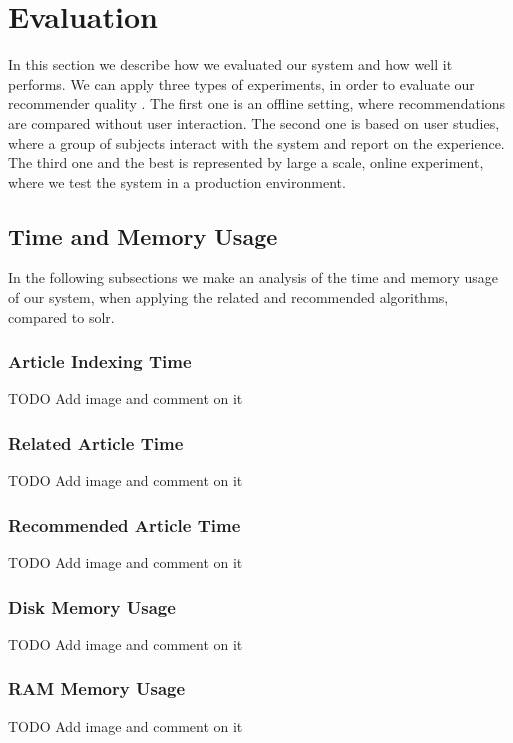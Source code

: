 \section{Evaluation} 
\label{sec:evaluation}
In this section we describe how we evaluated our system and how well it performs.
We can apply three types of experiments, in order to evaluate our recommender quality \cite{evaluate-recommender-system}. The first one is an offline setting, where recommendations are compared without user interaction. The second one is based on user studies, where a group of subjects interact with the system and report on the experience. The third one and the best is represented by large a scale, online experiment, where we test the system in a production environment.

\subsection{Time and Memory Usage}
\label{sec:time-memory-usage}
In the following subsections we make an analysis of the time and memory usage of our system, when applying the related and recommended algorithms, compared to solr.

\subsubsection{Article Indexing Time}
\label{sec:article-indexing-time}
TODO Add image and comment on it

\subsubsection{Related Article Time}
\label{sec:related-articles-time}
TODO Add image and comment on it

\subsubsection{Recommended Article Time}
\label{sec:recommended-articles-time}
TODO Add image and comment on it

\subsubsection{Disk Memory Usage}
\label{sec:disk-memory-usage}
TODO Add image and comment on it

\subsubsection{RAM Memory Usage}
\label{sec:ram-memory-usage}
TODO Add image and comment on it

